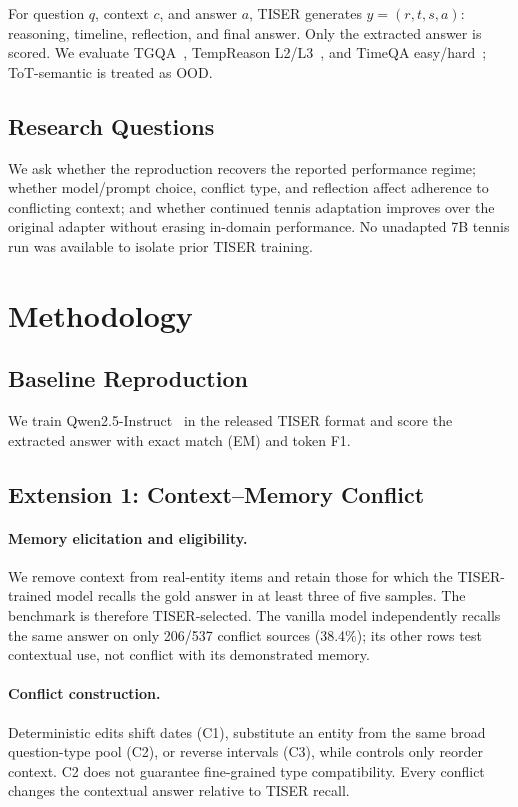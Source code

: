 \documentclass[conference]{IEEEtran}
\begin{document}
For question $q$, context $c$, and answer $a$, TISER generates $y=(r,t,s,a)$: reasoning, timeline, reflection, and final answer. Only the extracted answer is scored. We evaluate TGQA~\cite{xiong2024tgqa}, TempReason L2/L3~\cite{tan2023tempreason}, and TimeQA easy/hard~\cite{chen2021timeqa}; ToT-semantic is treated as OOD.

\subsection{Research Questions}

We ask whether the reproduction recovers the reported performance regime; whether model/prompt choice, conflict type, and reflection affect adherence to conflicting context; and whether continued tennis adaptation improves over the original adapter without erasing in-domain performance. No unadapted 7B tennis run was available to isolate prior TISER training.

\section{Methodology}
\label{sec:methodology}

\subsection{Baseline Reproduction}

We train Qwen2.5-Instruct~\cite{qwen2024qwen25} in the released TISER format and score the extracted answer with exact match (EM) and token F1.

\subsection{Extension 1: Context--Memory Conflict}

\paragraph{Memory elicitation and eligibility.}
We remove context from real-entity items and retain those for which the TISER-trained model recalls the gold answer in at least three of five samples. The benchmark is therefore TISER-selected. The vanilla model independently recalls the same answer on only 206/537 conflict sources (38.4\%); its other rows test contextual use, not conflict with its demonstrated memory.

\paragraph{Conflict construction.}
Deterministic edits shift dates (C1), substitute an entity from the same broad question-type pool (C2), or reverse intervals (C3), while controls only reorder context. C2 does not guarantee fine-grained type compatibility. Every conflict changes the contextual answer relative to TISER recall.
\end{document}
